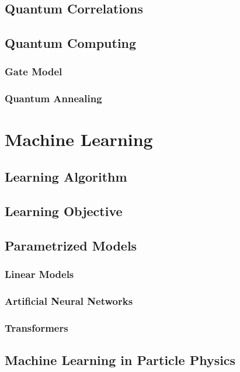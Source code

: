 \subsection{Quantum Correlations}

\subsection{Quantum Computing}

\subsubsection{Gate Model}

\subsubsection{Quantum Annealing}

\section{Machine Learning}

\subsection{Learning Algorithm}

\subsection{Learning Objective}

\subsection{Parametrized Models}

\subsubsection{Linear Models}

\subsubsection{Artificial Neural Networks}

\subsubsection{Transformers}

\subsection{Machine Learning in Particle Physics}

